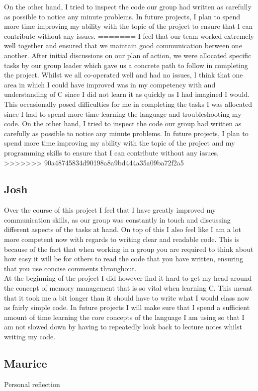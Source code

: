 \documentclass[11pt]{article}
\begin{document}
On the other hand, I tried to inspect the code our group had written as carefully as possible to notice any minute problems. In future projects, I plan to spend more time improving my ability with the topic of the project to ensure that I can contribute without any issues.  
=======
I feel that our team worked extremely well together and ensured that we maintain good communication between one another. After initial discussions on our plan of action, we were allocated specific tasks by our group leader which gave us a concrete path to follow in completing the project. Whilst we all co-operated well and had no issues, I think that one area in which I could have improved was in my competency with and understanding of C since I did not learn it as quickly as I had imagined I would. This occasionally posed difficulties for me in completing the tasks I was allocated since I had to spend more time learning the language and troubleshooting my code. On the other hand, I tried to inspect the code our group had written as carefully as possible to notice any minute problems. In future projects, I plan to spend more time improving my ability with the topic of the project and my programming skills to ensure that I can contribute without any issues.  
>>>>>>> 90a48745834d90198a8a9bd444a35a09ba72f2a5


\subsection{Josh}
Over the course of this project I feel that I have greatly improved my communication skills, as our group was constantly in touch and discussing different aspects of the tasks at hand. On top of this I also feel like I am a lot more competent now with regards to writing clear and readable code. This is because of the fact that when working in a group you are required to think about how easy it will be for others to read the code that you have written, ensuring that you use concise comments throughout. \\

At the beginning of the project I did however find it hard to get my head around the concept of memory management that is so vital when learning C. This meant that it took me a bit longer than it should have to write what I would class now as fairly simple code. In future projects I will make sure that I spend a sufficient amount of time learning the core concepts of the language I am using so that I am not slowed down by having to repeatedly look back to lecture notes whilst writing my code.

\subsection{Maurice}
Personal reflection
\end{document}
